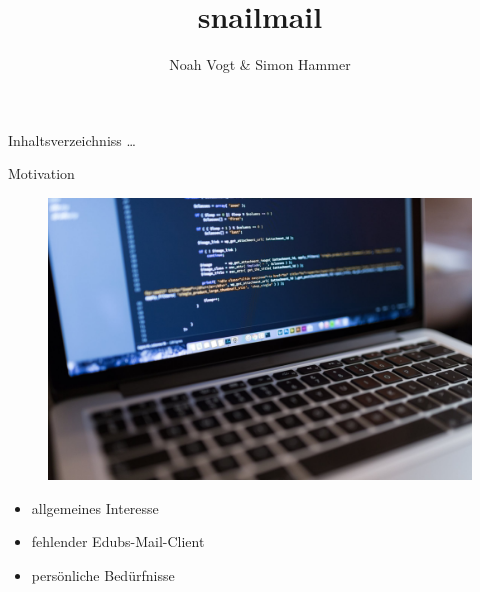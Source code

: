 \documentclass[aspectratio=169]{beamer}
\title{snailmail}
\author{Noah Vogt \& Simon Hammer}
\institute{Gymnasium Kirschgarten}
\newlength\myheight
\newlength\mydepth
\newcommand*\inlinegraphics[1]{
    \settototalheight\myheight{Xygp}
    \settodepth\mydepth{Xygp}
    \raisebox{-\mydepth}{\texttt{[image: \#1]}}%
}
\begin{document}
\maketitle

\begin{frame}{Inhaltsverzeichniss}
\ldots{}
\end{frame}


\begin{frame}{Motivation}
\begin{varwidth}{.5\textwidth}
        \begin{figure}
            \centering
            \includegraphics[width=.9\textwidth]{media/macbook.jpg}
        \end{figure}
    \end{varwidth}
    \hfill
    \begin{varwidth}{.5\textwidth}
        \begin{itemize}\pause
            \item allgemeines Interesse\pause
            \item fehlender Edubs-Mail-Client\pause
            \item persönliche Bedürfnisse
        \end{itemize}
    \end{varwidth} 
\end{frame}
\end{document}
